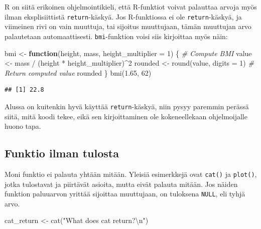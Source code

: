 \documentclass[
]{book}
\newenvironment{Shaded}{\begin{snugshade}}{\end{snugshade}}
\newcommand{\AttributeTok}[1]{\textcolor[rgb]{0.77,0.63,0.00}{#1}}
\newcommand{\CommentTok}[1]{\textcolor[rgb]{0.56,0.35,0.01}{\textit{#1}}}
\newcommand{\ControlFlowTok}[1]{\textcolor[rgb]{0.13,0.29,0.53}{\textbf{#1}}}
\newcommand{\DecValTok}[1]{\textcolor[rgb]{0.00,0.00,0.81}{#1}}
\newcommand{\FloatTok}[1]{\textcolor[rgb]{0.00,0.00,0.81}{#1}}
\newcommand{\FunctionTok}[1]{\textcolor[rgb]{0.00,0.00,0.00}{#1}}
\newcommand{\NormalTok}[1]{#1}
\newcommand{\OtherTok}[1]{\textcolor[rgb]{0.56,0.35,0.01}{#1}}
\newcommand{\SpecialCharTok}[1]{\textcolor[rgb]{0.00,0.00,0.00}{#1}}
\newcommand{\StringTok}[1]{\textcolor[rgb]{0.31,0.60,0.02}{#1}}
\begin{document}
R on siitä erikoinen ohjelmointikieli, että R-funktiot voivat palauttaa arvoja myös ilman eksplisiittistä \texttt{return}-käskyä. Jos R-funktiossa ei ole \texttt{return}-käskyä, ja viimeinen rivi on vain muuttuja, tai sijoitus muuttujaan, tämän muuttujan arvo palautetaan automaattisesti. \texttt{bmi}-funktion voisi siis kirjoittaa myös näin:

\begin{Shaded}
\begin{Highlighting}[]
\NormalTok{bmi }\OtherTok{\textless{}{-}} \ControlFlowTok{function}\NormalTok{(height, mass, }\AttributeTok{height\_multiplier =} \DecValTok{1}\NormalTok{) \{}
  \CommentTok{\# Compute BMI}
\NormalTok{  value }\OtherTok{\textless{}{-}}\NormalTok{ mass }\SpecialCharTok{/}\NormalTok{ (height }\SpecialCharTok{*}\NormalTok{ height\_multiplier)}\SpecialCharTok{\^{}}\DecValTok{2}
\NormalTok{  rounded }\OtherTok{\textless{}{-}} \FunctionTok{round}\NormalTok{(value, }\AttributeTok{digits =} \DecValTok{1}\NormalTok{)}
  \CommentTok{\# Return computed value}
\NormalTok{  rounded}
\NormalTok{\}}
\FunctionTok{bmi}\NormalTok{(}\FloatTok{1.65}\NormalTok{, }\DecValTok{62}\NormalTok{)}
\end{Highlighting}
\end{Shaded}

\begin{verbatim}
## [1] 22.8
\end{verbatim}

Alussa on kuitenkin hyvä käyttää \texttt{return}-käskyä, niin pysyy paremmin perässä siitä, mitä koodi tekee, eikä sen kirjoittaminen ole kokeneellekaan ohjelmoijalle huono tapa.

\hypertarget{funktio-ilman-tulosta}{%
\subsection{Funktio ilman tulosta}\label{funktio-ilman-tulosta}}

Moni funktio ei palauta yhtään mitään. Yleisiä esimerkkejä ovat \texttt{cat()} ja \texttt{plot()}, jotka tulostavat ja piirtävät asioita, mutta eivät palauta mitään. Jos näiden funktion paluuarvon yrittää sijoittaa muuttujaan, on tuloksena \texttt{NULL}, eli tyhjä arvo.

\begin{Shaded}
\begin{Highlighting}[]
\NormalTok{cat\_return }\OtherTok{\textless{}{-}} \FunctionTok{cat}\NormalTok{(}\StringTok{"What does cat return?}\SpecialCharTok{\textbackslash{}n}\StringTok{"}\NormalTok{)}
\end{Highlighting}
\end{Shaded}
\end{document}
